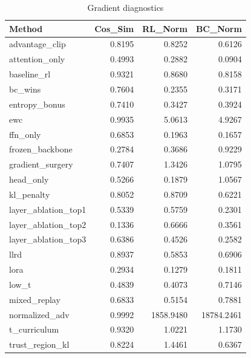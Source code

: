 \begin{table}[htbp]
\centering
\caption{Gradient diagnostics}
\label{tab:grad-diag}
\begin{tabular}{lrrr}
\toprule
\textbf{Method} & \textbf{Cos\_Sim} & \textbf{RL\_Norm} & \textbf{BC\_Norm} \\
\midrule
advantage\_clip & 0.8195 & 0.8252 & 0.6126 \\
attention\_only & 0.4993 & 0.2882 & 0.0904 \\
baseline\_rl & 0.9321 & 0.8680 & 0.8158 \\
bc\_wins & 0.7604 & 0.2355 & 0.3171 \\
entropy\_bonus & 0.7410 & 0.3427 & 0.3924 \\
ewc & 0.9935 & 5.0613 & 4.9267 \\
ffn\_only & 0.6853 & 0.1963 & 0.1657 \\
frozen\_backbone & 0.2784 & 0.3686 & 0.9229 \\
gradient\_surgery & 0.7407 & 1.3426 & 1.0795 \\
head\_only & 0.5266 & 0.1879 & 1.0567 \\
kl\_penalty & 0.8052 & 0.8709 & 0.6221 \\
layer\_ablation\_top1 & 0.5339 & 0.5759 & 0.2301 \\
layer\_ablation\_top2 & 0.1336 & 0.6666 & 0.3561 \\
layer\_ablation\_top3 & 0.6386 & 0.4526 & 0.2582 \\
llrd & 0.8937 & 0.5853 & 0.6906 \\
lora & 0.2934 & 0.1279 & 0.1811 \\
low\_t & 0.4839 & 0.4073 & 0.7146 \\
mixed\_replay & 0.6833 & 0.5154 & 0.7881 \\
normalized\_adv & 0.9992 & 1858.9480 & 18784.2461 \\
t\_curriculum & 0.9320 & 1.0221 & 1.1730 \\
trust\_region\_kl & 0.8224 & 1.4461 & 0.6367 \\
\bottomrule
\end{tabular}
\end{table}